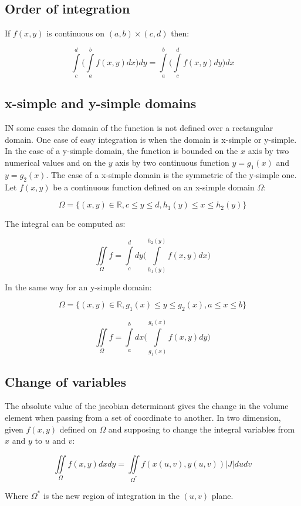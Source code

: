 	\subsection{Order of integration}
	If $f(x,y)$ is continuous on $(a,b)\times (c,d)$ then:

	$$\int\limits_c^d\biggl(\int\limits_a^b f(x,y)dx\biggr)dy = \int\limits_a^b\biggl(\int\limits_c^d f(x,y)dy\biggr)dx$$

	\subsection{x-simple and y-simple domains}
	IN some cases the domain of the function is not defined over a rectangular domain.
	One case of easy integration is when the domain is x-simple or y-simple.
	In the case of a y-simple domain, the function is bounded on the $x$ axis by two numerical values and on the $y$ axis by two continuous function $y = g_1(x)$ and $y = g_2(x)$.
	The case of a x-simple domain is the symmetric of the y-simple one.
	Let $f(x,y)$ be a continuous function defined on an x-simple domain $\Omega$:

	$$\Omega = \{(x,y)\in\mathbb{R}, c\le y\le d, h_1(y)\le x\le h_2(y)\}$$

	The integral can be computed as:

	$$\iint\limits_{\Omega} f = \int\limits_c^ddy\biggl(\int\limits_{h_1(y)}^{h_2(y)}f(x,y)dx\biggr)$$

	In the same way for an y-simple domain:

	$$\Omega = \{(x,y)\in\mathbb{R}, g_1(x)\le y\le g_2(x), a\le x\le b\}$$

	$$\iint\limits_\Omega f = \int\limits_a^bdx\biggl(\int\limits_{g_1(x)}^{g_2(x)}f(x,y)dy\biggr)$$

	\subsection{Change of variables}
	The absolute value of the jacobian determinant gives the change in the volume element when passing from a set of coordinate to another.
	In two dimension, given $f(x,y)$ defined on $\Omega$ and supposing to change the integral variables from $x$ and $y$ to $u$ and $v$:

	$$\iint\limits_\Omega f(x,y)dxdy = \iint\limits_{\Omega^*} f(x(u,v), y(u,v))|J|dudv$$

	Where $\Omega^*$ is the new region of integration in the $(u,v)$ plane.

